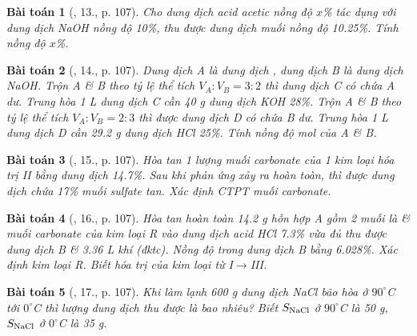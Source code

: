 \documentclass{article}
\newtheorem{baitoan}{Bài toán}
\begin{document}
\begin{baitoan}[\cite{An_Hoa_Hoc_nang_cao_8_9}, 13., p. 107]
	Cho dung dịch acid acetic nồng độ $x${\rm\%} tác dụng với dung dịch {\rm NaOH} nồng độ {\rm10\%}, thu được dung dịch muối nồng độ {\rm10.25\%}. Tính nồng độ $x${\rm\%}.
\end{baitoan}

\begin{baitoan}[\cite{An_Hoa_Hoc_nang_cao_8_9}, 14., p. 107]
	Dung dịch A là dung dịch {\rm{}}, dung dịch B là dung dịch {\rm NaOH}. Trộn A \& B theo tỷ lệ thể tích $V_A:V_B = 3:2$ thì dung dịch C có chứa A dư. Trung hòa {\rm1 L} dung dịch C cần {\rm40 g} dung dịch {\rm KOH 28\%}. Trộn A \& B theo tỷ lệ thể tích $V_A:V_B = 2:3$ thì được dung dịch D có chứa B dư. Trung hòa {\rm1 L} dung dịch D cần {\rm29.2 g} dung dịch {\rm HCl 25\%}. Tính nồng độ mol của A \& B.
\end{baitoan}

\begin{baitoan}[\cite{An_Hoa_Hoc_nang_cao_8_9}, 15., p. 107]
	Hòa tan 1 lượng muối carbonate của 1 kim loại hóa trị II bằng dung dịch {\rm{} 14.7\%}. Sau khi phản ứng xảy ra hoàn toàn, thì được dung dịch chứa {\rm17\%} muối sulfate tan. Xác định {\rm CTPT} muối carbonate.
\end{baitoan}

\begin{baitoan}[\cite{An_Hoa_Hoc_nang_cao_8_9}, 16., p. 107]
	Hòa tan hoàn toàn {\rm14.2 g} hỗn hợp A gồm 2 muối là {\rm{}} \& muối carbonate của kim loại R vào dung dịch acid {\rm HCl 7.3\%} vừa đủ thu được dung dịch B \& {3.36 L} khí {\rm{}} (đktc). Nồng độ {\rm{}} trong dung dịch B bằng {\rm6.028\%}. Xác định kim loại R. Biết hóa trị của kim loại từ I$\to$III.
\end{baitoan}

\begin{baitoan}[\cite{An_Hoa_Hoc_nang_cao_8_9}, 17., p. 107]
	Khi làm lạnh {\rm600 g} dung dịch {\rm NaCl} bão hòa ở $90^\circ${\rm C} tới $0^\circ${\rm C} thì lượng dung dịch thu được là bao nhiêu? Biết $S_{\rm NaCl}$ ở $90^\circ${\rm C} là {\rm50 g}, $S_{\rm NaCl}$ ở $0^\circ${\rm C} là {\rm35 g}.
\end{baitoan}


\printbibliography[heading=bibintoc]
\end{document}
